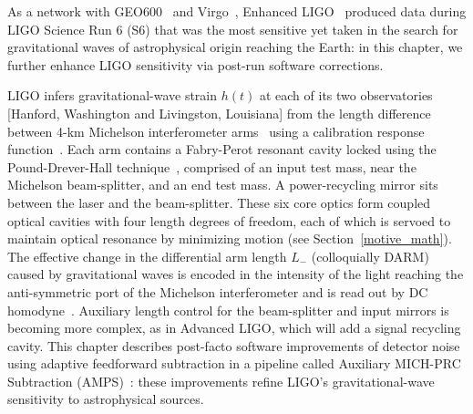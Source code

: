 	As a network with GEO600~\cite{Willke2002,Hild2009} and Virgo~\cite{Acernese2005}, Enhanced LIGO~\cite{LIGOFirst2004,Fricke2009} produced data during LIGO Science Run 6 (S6) that was the most sensitive yet taken in the search for gravitational waves of astrophysical origin reaching the Earth: in this chapter, we further enhance LIGO sensitivity via post-run software corrections. 

LIGO infers gravitational-wave strain $h(t)$ at each of its two observatories [Hanford, Washington and Livingston, Louisiana] from the length difference between 4-km Michelson interferometer arms~\cite{Saulson} using a calibration response function~\cite{AbadieCalibration2010}. Each arm contains a Fabry-Perot resonant cavity locked using the Pound-Drever-Hall technique~\cite{Drever1983,Black2001}, comprised of an input test mass, near the Michelson beam-splitter, and an end test mass. A power-recycling mirror sits between the laser and the beam-splitter. These six core optics form coupled optical cavities with four length degrees of freedom, each of which is servoed to maintain optical resonance by minimizing motion (see Section~\ref{motive_math}). The effective change in the differential arm length $L_-$ (colloquially DARM) caused by gravitational waves is encoded in the intensity of the light reaching the anti-symmetric port of the Michelson interferometer and is read out by DC homodyne~\cite{Fricke2009}. Auxiliary length control for the beam-splitter and input mirrors is becoming more complex, as in Advanced LIGO, which will add a signal recycling cavity. This chapter describes post-facto software improvements of detector noise using adaptive feedforward subtraction in a pipeline called Auxiliary MICH-PRC Subtraction (AMPS)~\cite{MatappsRepository}: these improvements refine LIGO's gravitational-wave sensitivity to astrophysical sources.


